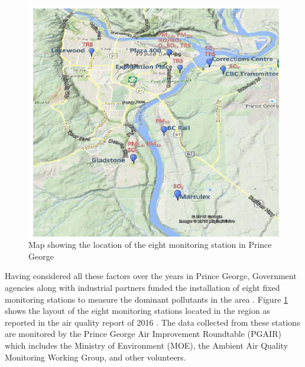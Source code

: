   \begin{figure}[h!]
  \begin{center}
  \includegraphics[scale=0.70]{./images/figure19.png}
  \end{center}
 
  \caption{Map showing the location of the eight monitoring station in Prince George \cite{Environment2016}}
  
  \label{Map}
  \end{figure}
 
  \vspace{5mm}
  

 Having considered all these factors over the years in Prince George, Government agencies along with industrial partners funded the installation of eight fixed monitoring stations to measure the dominant pollutants in the area \cite{Authority2011}. Figure \ref{Map} shows the layout of the eight monitoring stations located in the region as reported in the air quality report of 2016 \cite{Environment2016}. The data collected from these stations are monitored by the Prince George Air Improvement Roundtable (PGAIR)  which includes the Ministry of Environment (MOE), the Ambient Air Quality Monitoring Working Group, and other volunteers.
 
